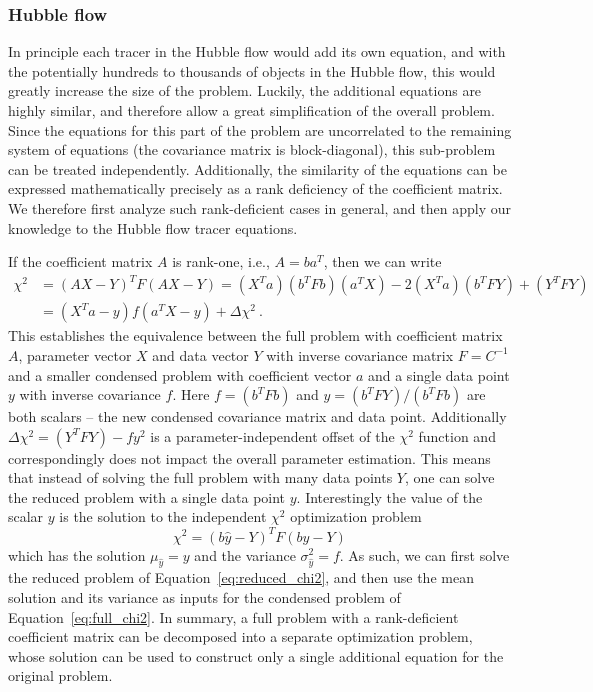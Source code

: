 \subsubsection{Hubble flow}\label{app:sec:eq_hf}
In principle each tracer in the Hubble flow would add its own equation, and with the potentially hundreds to thousands of objects in the Hubble flow, this would greatly increase the size of the problem. Luckily, the additional equations are highly similar, and therefore allow a great simplification of the overall problem. Since the equations for this part of the problem are uncorrelated to the remaining system of equations (the covariance matrix is block-diagonal), this sub-problem can be treated independently. Additionally, the similarity of the equations can be expressed mathematically precisely as a rank deficiency of the coefficient matrix. We therefore first analyze such rank-deficient cases in general, and then apply our knowledge to the Hubble flow tracer equations.

If the coefficient matrix $A$ is rank-one, i.e., $A = b a^T$, then we can write
\begin{align}
    \chi^2 & = (A X - Y)^T F (A X - Y) = (X^T a) (b^T F b) (a^T X) - 2 (X^T a) (b^T F Y) + (Y^T F Y) \\ & = (X^T a - y) f (a^T X - y) + \Delta \chi^2~. \label{eq:full_chi2}
\end{align}
This establishes the equivalence between the full problem with coefficient matrix $A$, parameter vector $X$ and data vector $Y$ with inverse covariance matrix $F = C^{-1}$ and a smaller condensed problem with coefficient vector $a$ and a single data point $y$ with inverse covariance $f$. Here $f = (b^T F b)$ and $y = (b^T F Y)/(b^T F b)$ are both scalars -- the new condensed covariance matrix and data point. Additionally $\Delta \chi^2 = (Y^T F Y) - f y^2$ is a parameter-independent offset of the $\chi^2$ function and correspondingly does not impact the overall parameter estimation. This means that instead of solving the full problem with many data points $Y$, one can solve the reduced problem with a single data point $y$. Interestingly the value of the scalar $y$ is the solution to the independent $\chi^2$ optimization problem
\begin{equation}
    \chi^2 = (b \hat{y} - Y)^T F (b \hat{y} - Y) \label{eq:reduced_chi2}
\end{equation}
which has the solution $\mu_{\hat{y}} = y$ and the variance $\sigma^2_{\hat{y}} = f$. As such, we can first solve the reduced problem of Equation~\ref{eq:reduced_chi2}, and then use the mean solution and its variance as inputs for the condensed problem of Equation~\ref{eq:full_chi2}. In summary, a full problem with a rank-deficient coefficient matrix can be decomposed into a separate optimization problem, whose solution can be used to construct only a single additional equation for the original problem.


